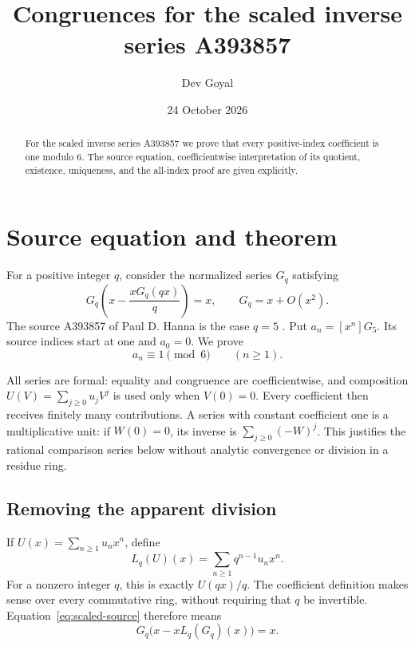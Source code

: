 \documentclass[11pt,a4paper]{article}
\title{Congruences for the scaled inverse series A393857}
\author{Dev Goyal}
\date{24 October 2026}
\theoremstyle{remark}\newtheorem{remark}[theorem]{Remark}
\begin{document}
\maketitle
\begin{center}\end{center}

\begin{abstract}
For the scaled inverse series A393857 we prove that every
positive-index coefficient is one modulo 6.
The source equation, coefficientwise interpretation of its quotient,
existence, uniqueness, and the all-index proof are given explicitly.
\end{abstract}
\section{Source equation and theorem}
For a positive integer $q$, consider the normalized series $G_q$ satisfying
\begin{equation}\label{eq:scaled-source}
 G_q\left(x-\frac{xG_q(qx)}q\right)=x,
 \qquad G_q=x+O(x^2).
\end{equation}
The source A393857 of Paul D. Hanna is the case $q=5$
\cite{oeis}. Put $a_n=[x^n]G_{5}$. Its source indices
start at one and $a_0=0$. We prove
\[
 a_n\equiv1\pmod{6}\qquad(n\ge1).
\]

All series are formal: equality and congruence are coefficientwise, and
composition $U(V)=\sum_{j\ge0}u_jV^j$ is used only when $V(0)=0$.
Every coefficient then receives finitely many contributions.
A series with constant coefficient one is a multiplicative unit:
if $W(0)=0$, its inverse is $\sum_{j\ge0}(-W)^j$.
This justifies the rational comparison series below without analytic
convergence or division in a residue ring.
\subsection{Removing the apparent division}

If $U(x)=\sum_{n\ge1}u_nx^n$, define
\[
L_q(U)(x)=\sum_{n\ge1}q^{n-1}u_nx^n.
\]
For a nonzero integer $q$, this is exactly $U(qx)/q$. The coefficient
definition makes sense over every commutative ring, without requiring
that $q$ be invertible. Equation~\eqref{eq:scaled-source} therefore
means
\begin{equation}\label{eq:scaled-nodiv}
G_q\bigl(x-xL_q(G_q)(x)\bigr)=x.
\end{equation}
\end{document}
